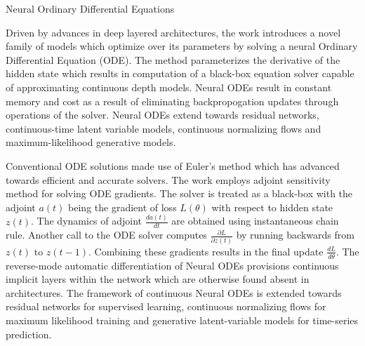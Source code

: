 \documentclass[11pt,letterpaper]{article}
\begin{document}
\begin{center}
  \large{Neural Ordinary Differential Equations}
\end{center}

Driven by advances in deep layered architectures, the work introduces a novel family of models which optimize over its parameters by solving a neural Ordinary Differential Equation (ODE). The method parameterizes the derivative of the hidden state which results in computation of a black-box equation solver capable of approximating continuous depth models. Neural ODEs result in constant memory and cost as a result of eliminating backpropogation updates through operations of the solver. Neural ODEs extend towards residual networks, continuous-time latent variable models, continuous normalizing flows and maximum-likelihood generative models. 

Conventional ODE solutions made use of Euler's method which has advanced towards efficient and accurate solvers. The work employs adjoint sensitivity method for solving ODE gradients. The solver is treated as a black-box with the adjoint $a(t)$ being the gradient of loss $L(\theta)$ with respect to hidden state $z(t)$. The dynamics of adjoint $\frac{d a(t)}{dt}$ are obtained using instantaneous chain rule. Another call to the ODE solver computes $\frac{\partial L}{\partial z(t)}$ by running backwards from $z(t)$ to $z(t-1)$. Combining these gradients results in the final update $\frac{dL}{d\theta}$. The reverse-mode automatic differentiation of Neural ODEs provisions continuous implicit layers within the network which are otherwise found absent in architectures. The framework of continuous Neural ODEs is extended towards residual networks for supervised learning, continuous normalizing flows for maximum likelihood training and generative latent-variable models for time-series prediction. 
\end{document}
